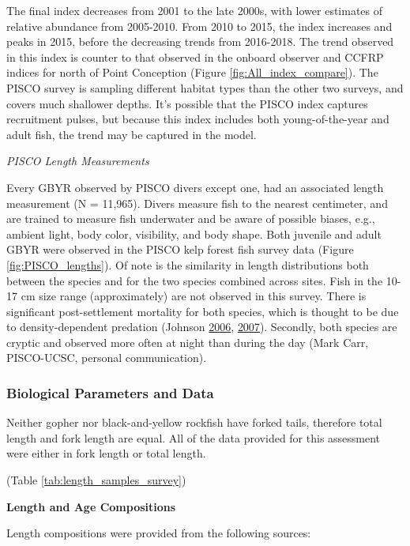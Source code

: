 \documentclass[12pt,]{article}
\begin{document}
The final index decreases from 2001 to the late 2000s, with lower
estimates of relative abundance from 2005-2010. From 2010 to 2015, the
index increases and peaks in 2015, before the decreasing trends from
2016-2018. The trend observed in this index is counter to that observed
in the onboard observer and CCFRP indices for north of Point Conception
(Figure \ref{fig:All_index_compare}). The PISCO survey is sampling
different habitat types than the other two surveys, and covers much
shallower depths. It's possible that the PISCO index captures
recruitment pulses, but because this index includes both
young-of-the-year and adult fish, the trend may be captured in the
model.

\emph{PISCO Length Measurements}

Every GBYR observed by PISCO divers except one, had an associated length
measurement (N = 11,965). Divers measure fish to the nearest centimeter,
and are trained to measure fish underwater and be aware of possible
biases, e.g., ambient light, body color, visibility, and body shape.
Both juvenile and adult GBYR were observed in the PISCO kelp forest fish
survey data (Figure \ref{fig:PISCO_lengths}). Of note is the similarity
in length distributions both between the species and for the two species
combined across sites. Fish in the 10-17 cm size range (approximately)
are not observed in this survey. There is significant post-settlement
mortality for both species, which is thought to be due to
density-dependent predation (Johnson
\protect\hyperlink{ref-Johnson2006}{2006},
\protect\hyperlink{ref-Johnson2007}{2007}). Secondly, both species are
cryptic and observed more often at night than during the day (Mark Carr,
PISCO-UCSC, personal communication).

\subsubsection{Biological Parameters and
Data}\label{biological-parameters-and-data}

Neither gopher nor black-and-yellow rockfish have forked tails,
therefore total length and fork length are equal. All of the data
provided for this assessment were either in fork length or total length.

(Table \ref{tab:length_samples_survey})

\textbf{Length and Age Compositions}

Length compositions were provided from the following sources:
\end{document}
